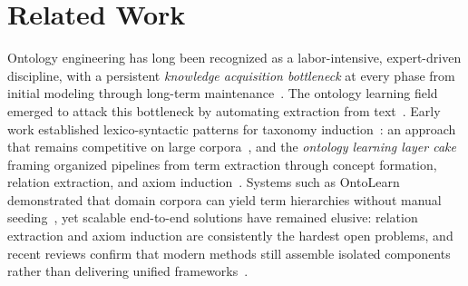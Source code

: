 \documentclass[sigconf]{acmart}
\begin{document}
\section{Related Work}
\label{sec:related-work}
Ontology engineering has long been recognized as a labor-intensive, expert-driven discipline, with a persistent \emph{knowledge acquisition bottleneck} at every phase from initial modeling through long-term maintenance~\cite{noy2001ontology,studer1998knowledge,gruber1993translation,tudorache2020ontology}. The ontology learning field emerged to attack this bottleneck by automating extraction from text~\cite{maedche2001ontology,cimiano2006ontology}. Early work established lexico-syntactic patterns for taxonomy induction~\cite{hearst1992automatic}: an approach that remains competitive on large corpora~\cite{roller2018hearst}, and the \emph{ontology learning layer cake} framing organized pipelines from term extraction through concept formation, relation extraction, and axiom induction~\cite{biemann2005ontology,asim2018survey}. Systems such as OntoLearn demonstrated that domain corpora can yield term hierarchies without manual seeding~\cite{navigli2004learning, velardi2013ontolearn}, yet scalable end-to-end solutions have remained elusive: relation extraction and axiom induction are consistently the hardest open problems, and recent reviews confirm that modern methods still assemble isolated components rather than delivering unified frameworks~\cite{du2024short,lourdusamy2019survey}.
\end{document}
